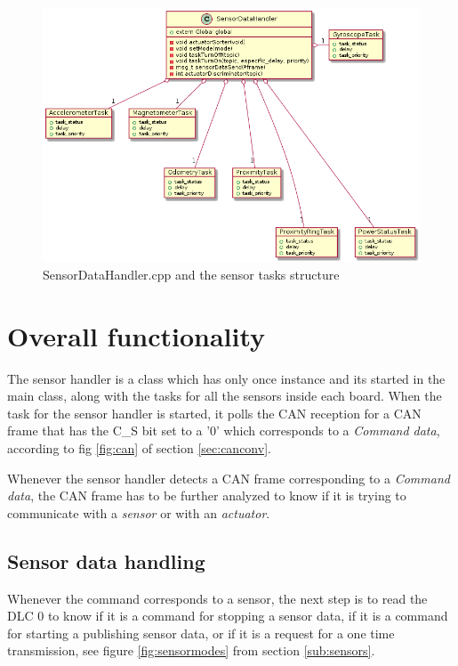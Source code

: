 \documentclass[12pt]{report}%
\begin{document}
\begin{figure}[ht]
	\includegraphics[width=15cm]{sensorclass}%
  	\caption{SensorDataHandler.cpp and the sensor tasks structure}
  	\label{fig:sensorclass}
\end{figure}

\section{Overall functionality}
The sensor handler is a class which has only once instance and its started in the main class, along with the tasks for all the sensors inside each board. When the task for the sensor handler is started, it polls the CAN reception for a CAN frame that has the C\_S bit set to a '0' which corresponds to a \textit{Command data}, according to fig \ref{fig:can} of section \ref{sec:canconv}.

Whenever the sensor handler detects a CAN frame corresponding to a \textit{Command data}, the CAN frame has to be further analyzed to know if it is trying to communicate with a \textit{sensor} or with an \textit{actuator}.

\subsection{Sensor data handling}
Whenever the command corresponds to a sensor, the next step is to read the DLC 0 to know if it is a command for stopping a sensor data, if it is a command for starting a publishing sensor data, or if it is a request for a one time transmission, see figure \ref{fig:sensormodes} from section \ref{sub:sensors}.
\end{document}
